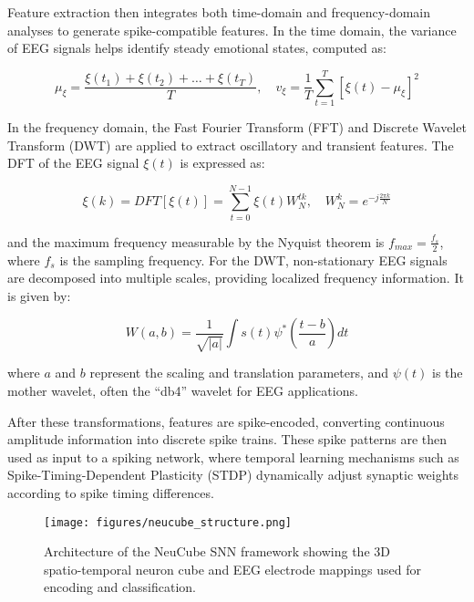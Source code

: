 \documentclass[conference]{IEEEtran}
\begin{document}
Feature extraction then integrates both time-domain and frequency-domain analyses to generate spike-compatible features. In the time domain, the variance of EEG signals helps identify steady emotional states, computed as:

\begin{equation}
\mu_{\xi} = \frac{\xi(t_1) + \xi(t_2) + \dots + \xi(t_T)}{T}, \quad
v_{\xi} = \frac{1}{T} \sum_{t=1}^{T} [\xi(t) - \mu_{\xi}]^2
\end{equation}

In the frequency domain, the Fast Fourier Transform (FFT) and Discrete Wavelet Transform (DWT) are applied to extract oscillatory and transient features. The DFT of the EEG signal \( \xi(t) \) is expressed as:

\begin{equation}
\xi(k) = DFT[\xi(t)] = \sum_{t=0}^{N-1} \xi(t) W_N^{tk}, \quad W_N^k = e^{-j \frac{2\pi k}{N}}
\end{equation}

and the maximum frequency measurable by the Nyquist theorem is \( f_{max} = \frac{f_s}{2} \), where \( f_s \) is the sampling frequency.  
For the DWT, non-stationary EEG signals are decomposed into multiple scales, providing localized frequency information. It is given by:

\begin{equation}
W(a,b) = \frac{1}{\sqrt{|a|}} \int s(t) \psi^* \left( \frac{t - b}{a} \right) dt
\end{equation}

where \(a\) and \(b\) represent the scaling and translation parameters, and \(\psi(t)\) is the mother wavelet, often the “db4” wavelet for EEG applications.

After these transformations, features are spike-encoded, converting continuous amplitude information into discrete spike trains. These spike patterns are then used as input to a spiking network, where temporal learning mechanisms such as Spike-Timing-Dependent Plasticity (STDP) dynamically adjust synaptic weights according to spike timing differences.

\begin{figure}[H]
    \centering
    \texttt{[image: figures/neucube\_structure.png]}
    \caption{Architecture of the NeuCube SNN framework showing the 3D spatio-temporal neuron cube and EEG electrode mappings used for encoding and classification.}
    \label{fig:neucube_structure}
\end{figure}
\end{document}

